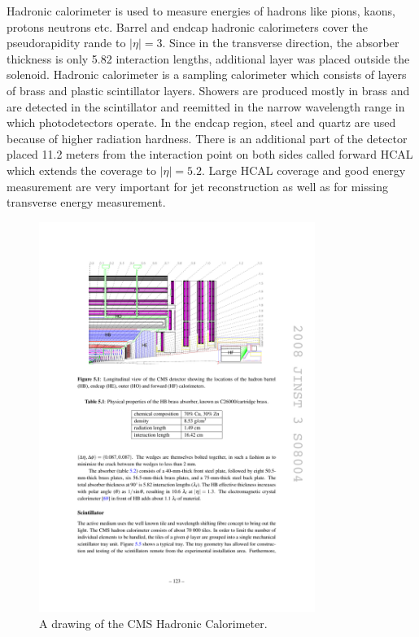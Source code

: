 Hadronic calorimeter is used to measure energies of hadrons like pions, kaons, protons neutrons etc. Barrel and endcap hadronic calorimeters cover the pseudorapidity rande to $|\eta|=3$. 
Since in the transverse direction, the absorber thickness is only 5.82 interaction lengths, additional layer was placed outside the solenoid.  Hadronic calorimeter is a sampling calorimeter which consists of layers of brass and plastic scintillator layers. Showers are produced mostly in brass and are detected in the scintillator and reemitted in the narrow wavelength range in which photodetectors operate. In the endcap region, steel and quartz are used because of higher radiation hardness. There is an additional part of the detector placed 11.2 meters from the interaction point on both sides called forward HCAL which extends the coverage to $|\eta|=5.2$. Large HCAL coverage and good energy measurement are very important for jet reconstruction as well as for missing transverse energy measurement.  
\begin{figure}[htbp]
	\centering
		\includegraphics[width=0.8\textwidth]{Figures/HCAL.pdf}
	\caption[CMS Hadronic Calorimeter]{A drawing of the CMS Hadronic Calorimeter. \cite{Chatrchyan:2008aa}}
	\label{fig:HCAL}
\end{figure}


